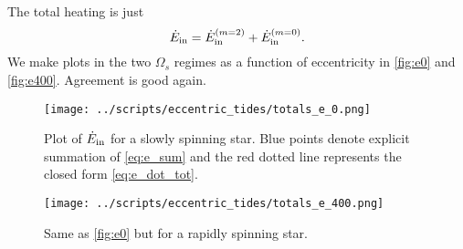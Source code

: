 \documentclass[
        fleqn,
        usenatbib,
        referee,
    ]{mnras}
\begin{document}
The total heating is just
\begin{equation}
    \dot{E}_{\rm in} = \dot{E}_{\rm in}^{(m = 2)} + \dot{E}_{\rm in}^{(m = 0)}.
        \label{eq:e_dot_tot}
\end{equation}
We make plots in the two $\Omega_s$ regimes as a function of eccentricity in
\autoref{fig:e0} and \autoref{fig:e400}. Agreement is good again.
\begin{figure}
    \centering
    \texttt{[image: ../scripts/eccentric\_tides/totals\_e\_0.png]}
    \caption{Plot of $\dot{E}_{\rm in}$ for a slowly spinning star. Blue points
    denote explicit summation of \autoref{eq:e_sum} and the red dotted line
    represents the closed form \autoref{eq:e_dot_tot}.}\label{fig:e0}
\end{figure}
\begin{figure}
    \centering
    \texttt{[image: ../scripts/eccentric\_tides/totals\_e\_400.png]}
    \caption{Same as \autoref{fig:e0} but for a rapidly spinning
    star.}\label{fig:e400}
\end{figure}





\bsp
\label{lastpage} %
\end{document}
